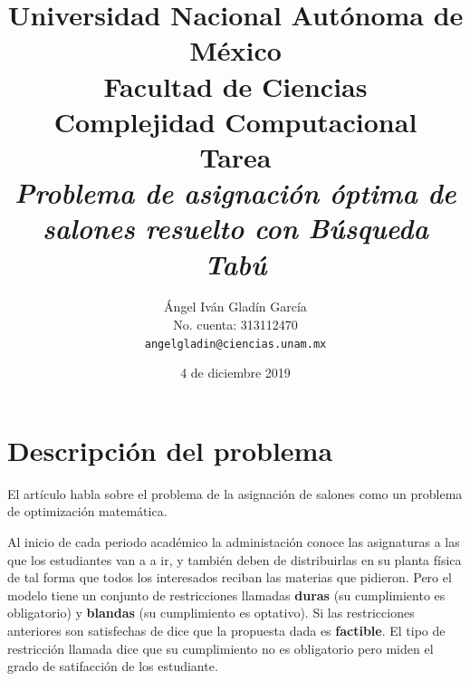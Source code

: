 \documentclass[12pt,letterpaper]{article}
\begin{document}
\title{
        Universidad Nacional Autónoma de México\\
        Facultad de Ciencias\\
        Complejidad Computacional\\
    \vspace{1cm}
    \large
        \textbf{Tarea}\\
        \textbf{\textit{Problema de asignación óptima de salones resuelto con Búsqueda Tabú}}
}
\author{
    Ángel Iván Gladín García\\
    No. cuenta: 313112470\\
    \texttt{angelgladin@ciencias.unam.mx}
}
\date{4 de diciembre 2019}
\maketitle

\newtheorem{theorem}{Teorema}
\newtheorem{example}{Ejemplo}
\newtheorem{corollary}{Corolario}
\newtheorem{lemma}{Lemma}
\newtheorem{definition}{Definicion}
\newtheorem{prop}{Proposicion}

\section{Descripción del problema}
El artículo habla sobre el problema de la asignación de salones como un problema de optimización matemática.

Al inicio de cada periodo académico la administación conoce las asignaturas a las que los estudiantes
van a a ir, y también deben de distribuirlas en su planta física de tal forma que todos los interesados
reciban las materias que pidieron. Pero el modelo tiene un conjunto de restricciones llamadas
\textbf{duras} (su cumplimiento es obligatorio) y \textbf{blandas} (su cumplimiento es optativo).
Si las restricciones anteriores son satisfechas de dice que la propuesta dada es \textbf{factible}. 
El tipo de restricción llamada  dice que su cumplimiento no es obligatorio
pero miden el grado de satifacción de los estudiante.
\end{document}

